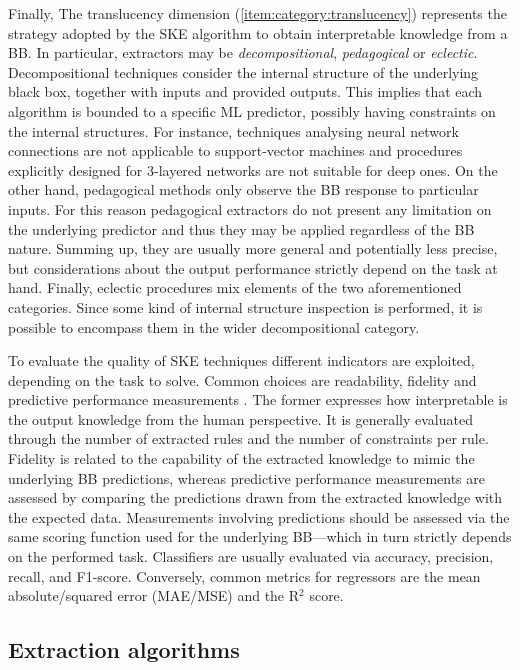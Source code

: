 \documentclass[
]{ceurart}
\begin{document}
Finally, The translucency dimension \cite{andrews1995survey} (\cref{item:category:translucency}) represents the strategy adopted by the SKE algorithm to obtain interpretable knowledge from a BB.
%
In particular, extractors may be \emph{decompositional}, \emph{pedagogical} or \emph{eclectic}.
%
Decompositional techniques consider the internal structure of the underlying black box, together with inputs and provided outputs.
%
This implies that each algorithm is bounded to a specific ML predictor, possibly having constraints on the internal structures.
%
For instance, techniques analysing neural network connections are not applicable to support-vector machines and procedures explicitly designed for 3-layered networks are not suitable for deep ones.
%
On the other hand, pedagogical methods only observe the BB response to particular inputs.
%
For this reason pedagogical extractors do not present any limitation on the underlying predictor and thus they may be applied regardless of the BB nature.
%
Summing up, they are usually more general and potentially less precise, but considerations about the output performance strictly depend on the task at hand.
%
Finally, eclectic procedures mix elements of the two aforementioned categories.
%
Since some kind of internal structure inspection is performed, it is possible to encompass them in the wider decompositional category.

To evaluate the quality of SKE techniques different indicators are exploited, depending on the task to solve.
%
Common choices are readability, fidelity and predictive performance measurements \cite{towell1993extracting}.
%
The former expresses how interpretable is the output knowledge from the human perspective.
%
It is generally evaluated through the number of extracted rules and the number of constraints per rule.
%
Fidelity is related to the capability of the extracted knowledge to mimic the underlying BB predictions, whereas predictive performance measurements are assessed by comparing the predictions drawn from the extracted knowledge with the expected data.
%
Measurements involving predictions should be assessed via the same scoring function used for the underlying BB---which in turn strictly depends on the performed task.
%
Classifiers are usually evaluated via accuracy, precision, recall, and F1-score.
%
Conversely, common metrics for regressors are the mean absolute/squared error (MAE/MSE) and the R${^2}$ score.

\subsection{Extraction algorithms}\label{ssec:algorithms}
\end{document}
